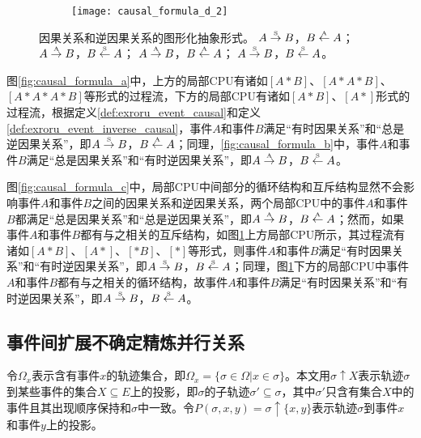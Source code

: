 \begin{figure}[htbp]
\begin{subfigure}{0.85\textwidth}
\begin{minipage}[b]{1\textwidth}
  	  \vspace{1em}
  	  \centering
  	  \texttt{[image: causal\_formula\_d\_2]}
  	\end{minipage}
  	\caption{}
  	\label{fig:causal_formula_d}
  \end{subfigure}
  \vspace{6pt}
  \caption{因果关系和逆因果关系的图形化抽象形式。 $A\overset{\text{\tiny{S}}}{\rightarrow}B$，$B\overset{\text{\tiny{A}}}{\leftarrow}A$； $A\overset{\text{\tiny{A}}}{\rightarrow}B$，$B\overset{\text{\tiny{S}}}{\leftarrow}A$； $A\overset{\text{\tiny{A}}}{\rightarrow}B$，$B\overset{\text{\tiny{A}}}{\leftarrow}A$； $A\overset{\text{\tiny{S}}}{\rightarrow}B$，$B\overset{\text{\tiny{S}}}{\leftarrow}A$。}
  \label{fig:event_causal_formulas}
\end{figure}

图\ref{fig:causal_formula_a}中，上方的局部CPU有诸如$[A*B]$、$[A*A*B]$、$[A*A*A*B]$等形式的过程流，下方的局部CPU有诸如$[A*B]$、$[A*]$形式的过程流，根据定义\ref{def:exroru_event_causal}和定义\ref{def:exroru_event_inverse_causal}，事件$A$和事件$B$满足“有时因果关系”和“总是逆因果关系”，即$A\overset{\text{\tiny{S}}}{\rightarrow}B$，$B\overset{\text{\tiny{A}}}{\leftarrow}A$；同理，\ref{fig:causal_formula_b}中，事件$A$和事件$B$满足“总是因果关系”和“有时逆因果关系”，即$A\overset{\text{\tiny{A}}}{\rightarrow}B$，$B\overset{\text{\tiny{S}}}{\leftarrow}A$。

图\ref{fig:causal_formula_c}中，局部CPU中间部分的循环结构和互斥结构显然不会影响事件$A$和事件$B$之间的因果关系和逆因果关系，两个局部CPU中的事件$A$和事件$B$都满足“总是因果关系”和“总是逆因果关系”，即$A\overset{\text{\tiny{A}}}{\rightarrow}B$，$B\overset{\text{\tiny{A}}}{\leftarrow}A$；然而，如果事件$A$和事件$B$都有与之相关的互斥结构，如图\ref{fig:causal_formula_d}上方局部CPU所示，其过程流有诸如$[A*B]$、$[A*]$、$[*B]$、$[*]$等形式，则事件$A$和事件$B$满足“有时因果关系”和“有时逆因果关系”，即$A\overset{\text{\tiny{S}}}{\rightarrow}B$，$B\overset{\text{\tiny{S}}}{\leftarrow}A$；同理，图\ref{fig:causal_formula_d}下方的局部CPU中事件$A$和事件$B$都有与之相关的循环结构，故事件$A$和事件$B$满足“有时因果关系”和“有时逆因果关系”，即$A\overset{\text{\tiny{S}}}{\rightarrow}B$，$B\overset{\text{\tiny{S}}}{\leftarrow}A$。

\subsection{事件间扩展不确定精炼并行关系}\label{subsec:exroru_event_concurrent}
令$\Omega_{x}$表示含有事件$x$的轨迹集合，即$\Omega_{x}=\{\sigma\in\Omega|x\in\sigma\}$。本文用$\sigma\uparrow X$表示轨迹$\sigma$到某些事件的集合$X\subseteq E$上的投影，即$\sigma$的子轨迹$\sigma'\subseteq\sigma$，其中$\sigma'$只含有集合$X$中的事件且其出现顺序保持和$\sigma$中一致。令$P(\sigma,x,y)=\sigma\uparrow\{x,y\}$表示轨迹$\sigma$到事件$x$和事件$y$上的投影。

